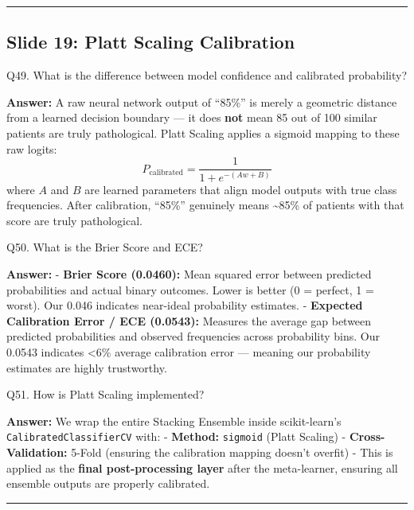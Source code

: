 \documentclass[11pt,a4paper]{article}
\begin{document}
\begin{center}\rule{0.5\linewidth}{0.5pt}\end{center}

\subsection{Slide 19: Platt Scaling
Calibration}\label{slide-19-platt-scaling-calibration}

\begin{questionbox}
Q49. What is the difference between model confidence and
calibrated probability?
\end{questionbox}
\textbf{Answer:} A raw neural network output of ``85\%'' is merely a
geometric distance from a learned decision boundary --- it does
\textbf{not} mean 85 out of 100 similar patients are truly pathological.
Platt Scaling applies a sigmoid mapping to these raw logits:
\[P_{\text{calibrated}} = \frac{1}{1 + e^{-(Aw + B)}}\] where \(A\) and
\(B\) are learned parameters that align model outputs with true class
frequencies. After calibration, ``85\%'' genuinely means
\textasciitilde85\% of patients with that score are truly pathological.

\begin{questionbox}
Q50. What is the Brier Score and ECE?
\end{questionbox}
\textbf{Answer:} - \textbf{Brier Score (0.0460):} Mean squared error between
predicted probabilities and actual binary outcomes. Lower is better (0 =
perfect, 1 = worst). Our 0.046 indicates near-ideal probability
estimates. - \textbf{Expected Calibration Error / ECE (0.0543):}
Measures the average gap between predicted probabilities and observed
frequencies across probability bins. Our 0.0543 indicates \textless6\%
average calibration error --- meaning our probability estimates are
highly trustworthy.

\begin{questionbox}
Q51. How is Platt Scaling implemented?
\end{questionbox}
\textbf{Answer:} We wrap the entire Stacking Ensemble inside scikit-learn's
\texttt{CalibratedClassifierCV} with: - \textbf{Method:}
\texttt{sigmoid} (Platt Scaling) - \textbf{Cross-Validation:} 5-Fold
(ensuring the calibration mapping doesn't overfit) - This is applied as
the \textbf{final post-processing layer} after the meta-learner,
ensuring all ensemble outputs are properly calibrated.

\begin{center}\rule{0.5\linewidth}{0.5pt}\end{center}
\end{document}

